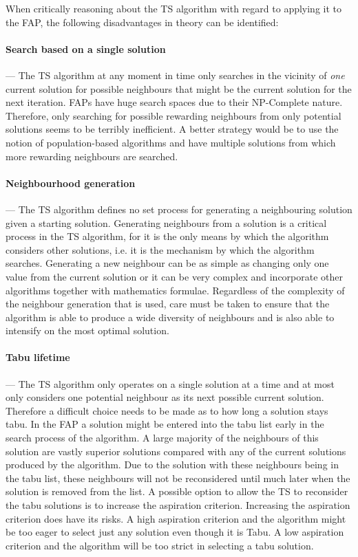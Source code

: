 When critically reasoning about the \gls{TS} algorithm with regard to applying it to the \gls{FAP}, the following disadvantages in theory can be identified:
\paragraph{Search based on a single solution}
--- The \gls{TS} algorithm at any moment in time only searches in the vicinity of \emph{one} current solution for possible neighbours that might be the current solution for the next iteration. \gls{FAP}s have huge search spaces due to their NP-Complete nature. Therefore, only searching for possible rewarding neighbours from only potential solutions seems to be terribly inefficient. A better strategy would be to use the notion of population-based algorithms and have multiple solutions from which more rewarding neighbours are searched.
\paragraph{Neighbourhood generation}
--- The \gls{TS} algorithm defines no set process for generating a neighbouring solution given a starting solution. Generating neighbours from a solution is a critical process in the \gls{TS} algorithm, for it is the only means by which the algorithm considers other solutions, i.e. it is the mechanism by which the algorithm searches. Generating a new neighbour can be as simple as changing only one value from the current solution or it can be very complex and incorporate other algorithms together with mathematics formulae. Regardless of the complexity of the neighbour generation that is used, care must be taken to ensure that the algorithm is able to produce a wide diversity of neighbours and is also able to intensify on the most optimal solution.
\paragraph{Tabu lifetime}
--- The \gls{TS} algorithm only operates on a single solution at a time and at most only considers one potential neighbour as its next possible current solution. Therefore a difficult choice needs to be made as to how long a solution stays tabu. In the \gls{FAP} a solution might be entered into the tabu list early in the search process of the algorithm. A large majority of the neighbours of this solution are vastly superior solutions compared with any of the current solutions produced by the algorithm. Due to the solution with these neighbours being in the tabu list, these neighbours will not be reconsidered until much later when the solution is removed from the list. A possible option to allow the \gls{TS} to reconsider the tabu solutions is to increase the aspiration criterion. Increasing the aspiration criterion does have its risks. A high aspiration criterion and the algorithm might be too eager to select just any solution even though it is Tabu. A low aspiration criterion and the algorithm will be too strict in selecting a tabu solution.

